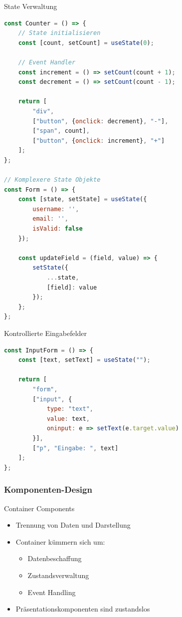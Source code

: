 \begin{KR}{State Verwaltung}
\begin{lstlisting}[language=JavaScript, style=basesmol]
const Counter = () => {
    // State initialisieren
    const [count, setCount] = useState(0);
    
    // Event Handler
    const increment = () => setCount(count + 1);
    const decrement = () => setCount(count - 1);
    
    return [
        "div",
        ["button", {onclick: decrement}, "-"],
        ["span", count],
        ["button", {onclick: increment}, "+"]
    ];
};

// Komplexere State Objekte
const Form = () => {
    const [state, setState] = useState({
        username: '',
        email: '',
        isValid: false
    });
    
    const updateField = (field, value) => {
        setState({
            ...state,
            [field]: value
        });
    };
};
\end{lstlisting}
\end{KR}

\begin{KR}{Kontrollierte Eingabefelder}
\begin{lstlisting}[language=JavaScript, style=basesmol]
const InputForm = () => {
    const [text, setText] = useState("");
    
    return [
        "form",
        ["input", {
            type: "text",
            value: text,
            oninput: e => setText(e.target.value)
        }],
        ["p", "Eingabe: ", text]
    ];
};
\end{lstlisting}
\end{KR}

\subsubsection{Komponenten-Design}

\begin{concept}{Container Components}
    \begin{itemize}
        \item Trennung von Daten und Darstellung
        \item Container kümmern sich um:
            \begin{itemize}
                \item Datenbeschaffung
                \item Zustandsverwaltung
                \item Event Handling
            \end{itemize}
        \item Präsentationskomponenten sind zustandslos
    \end{itemize}
\end{concept}

